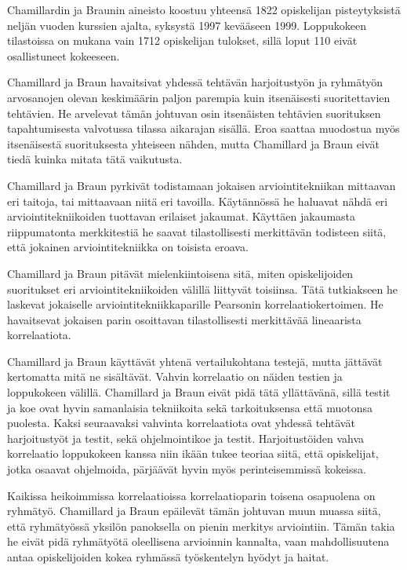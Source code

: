 \documentclass[finnish]{../tktltiki2}
\theoremstyle{definition}
\theoremstyle{remark}
\begin{document}
Chamillardin ja Braunin aineisto koostuu yhteensä 1822 opiskelijan pisteytyksistä neljän vuoden kurssien ajalta, syksystä 1997 kevääseen 1999. Loppukokeen tilastoissa on mukana vain 1712 opiskelijan tulokset, sillä loput 110 eivät osallistuneet kokeeseen.

Chamillard ja Braun havaitsivat yhdessä tehtävän harjoitustyön ja ryhmä\-työn arvosanojen olevan keskimäärin paljon parempia kuin itsenäisesti suoritettavien tehtävien. He arvelevat tämän johtuvan osin itsenäisten tehtävien suorituksen tapahtumisesta valvotussa tilassa aikarajan sisällä. Eroa saattaa muodostua myös itsenäisestä suorituksesta yhteiseen nähden, mutta Chamillard ja Braun eivät tiedä kuinka mitata tätä vaikutusta.

Chamillard ja Braun pyrkivät todistamaan jokaisen arviointitekniikan mittaavan eri taitoja, tai mittaavaan niitä eri tavoilla. Käytännössä he haluavat nähdä eri arviointitekniikoiden tuottavan erilaiset jakaumat. Käyttäen jakaumasta riippumatonta merkkitestiä he saavat tilastollisesti merkittävän todisteen siitä, että jokainen arviointitekniikka on toisista eroava.

Chamillard ja Braun pitävät mielenkiintoisena sitä, miten opiskelijoiden suoritukset eri arviointitekniikoiden välillä liittyvät toisiinsa. Tätä tutkiakseen he laskevat jokaiselle arviointitekniikkaparille Pearsonin korrelaatiokertoimen. He havaitsevat jokaisen parin osoittavan tilastollisesti merkittävää lineaarista korrelaatiota.

Chamillard ja Braun käyttävät yhtenä vertailukohtana testejä, mutta jättävät kertomatta mitä ne sisältävät. Vahvin korrelaatio on näiden testien ja loppukokeen välillä. Chamillard ja Braun eivät pidä tätä yllättävänä, sillä testit ja koe ovat hyvin samanlaisia tekniikoita sekä tarkoituksensa että muotonsa puolesta. Kaksi seuraavaksi vahvinta korrelaatiota ovat yhdessä tehtävät harjoitustyöt ja testit, sekä ohjelmointikoe ja testit. Harjoitustöiden vahva korrelaatio loppukokeen kanssa niin ikään tukee teoriaa siitä, että opiskelijat, jotka osaavat ohjelmoida, pärjäävät hyvin myös perinteisemmissä kokeissa.

Kaikissa heikoimmissa korrelaatioissa korrelaatioparin toisena osapuolena on ryhmätyö. Chamillard ja Braun epäilevät tämän johtuvan muun muassa siitä, että ryhmätyössä yksilön panoksella on pienin merkitys arviointiin. Tämän takia he eivät pidä ryhmätyötä oleellisena arvioinnin kannalta, vaan mahdollisuutena antaa opiskelijoiden kokea ryhmässä työskentelyn hyödyt ja haitat.
\end{document}
